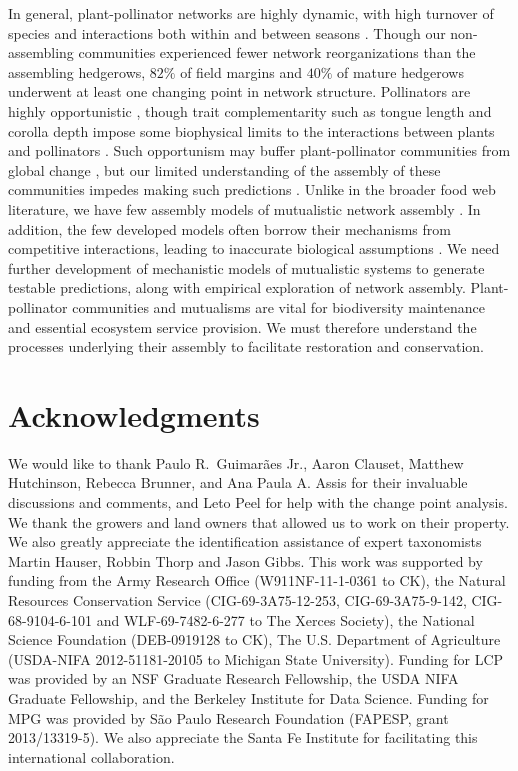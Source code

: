 \documentclass[12pt]{article}
\begin{document}
In general, plant-pollinator networks are highly dynamic, with high
turnover of species and interactions both within and between seasons
\citep{Burkle2011}. Though our non-assembling communities experienced
fewer network reorganizations than the assembling hedgerows, $82\%$ of
field margins and $40\%$ of mature hedgerows underwent at least one
changing point in network structure. Pollinators are highly
opportunistic \citep{petanidou-2008-564, Vazquez2005b,
  albrecht2010plant}, though trait complementarity such as tongue
length and corolla depth impose some biophysical limits to the
interactions between plants and pollinators \citep{Stang2006,
  Santamaria2007, Vazquez2009evaluating, Vazquez2009, Stang2009}. Such
opportunism may buffer plant-pollinator communities from global change
\citep[e.g.,][]{ramos2012topological, kaiser2010robustness}, but our
limited understanding of the assembly of these communities impedes
making such predictions \citep{Vazquez2009, Burkle2011}. Unlike in the
broader food web literature, we have few assembly models of
mutualistic network assembly \citep{valdovinos2013adaptive,
  Nuismer2013, Guimaraes2011}.  In addition, the few developed models
often borrow their mechanisms from competitive interactions, leading
to inaccurate biological assumptions \citep{holland2006comment}. We
need further development of mechanistic models of mutualistic systems
to generate testable predictions, along with empirical exploration of
network assembly. Plant-pollinator communities and mutualisms are
vital for biodiversity maintenance and essential ecosystem service
provision. We must therefore understand the processes underlying their
assembly to facilitate restoration and conservation.

\section*{Acknowledgments}
\label{sec:acknowledge}

We would like to thank Paulo R.~Guimar{\~a}es Jr., Aaron Clauset,
Matthew Hutchinson, Rebecca Brunner, and Ana Paula A. Assis for their
invaluable discussions and comments, and Leto Peel for help with the
change point analysis.  We thank the growers and land owners that
allowed us to work on their property. We also greatly appreciate the
identification assistance of expert taxonomists Martin Hauser, Robbin
Thorp and Jason Gibbs.  This work was supported by funding from the
Army Research Office (W911NF-11-1-0361 to CK), the Natural Resources
Conservation Service (CIG-69-3A75-12-253, CIG-69-3A75-9-142,
CIG-68-9104-6-101 and WLF-69-7482-6-277 to The Xerces Society), the
National Science Foundation (DEB-0919128 to CK), The U.S.  Department
of Agriculture (USDA-NIFA 2012-51181-20105 to Michigan State
University).  Funding for LCP was provided by an NSF Graduate Research
Fellowship, the USDA NIFA Graduate Fellowship, and the Berkeley
Institute for Data Science. Funding for MPG was provided by S{\~a}o
Paulo Research Foundation (FAPESP, grant 2013/13319-5). We also
appreciate the Santa Fe Institute for facilitating this international
collaboration.
\end{document}
